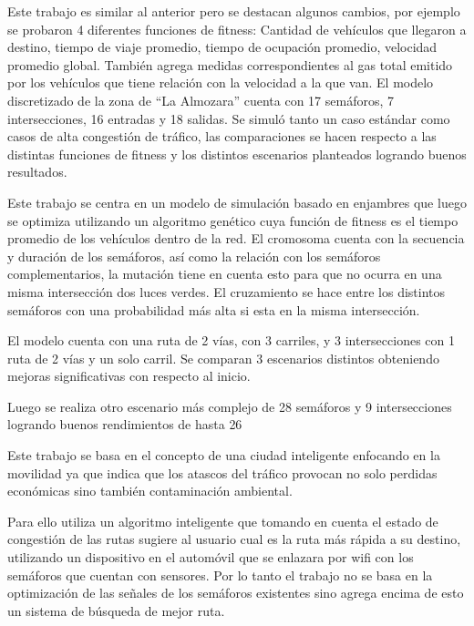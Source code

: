 \begin{itemize}
	\begin{item}
Este trabajo es similar al anterior pero se destacan algunos cambios, por ejemplo se probaron 4 diferentes funciones de fitness: Cantidad de vehículos que llegaron a destino, tiempo de viaje promedio, tiempo de ocupación promedio, velocidad promedio global.
También agrega medidas correspondientes al gas total emitido por los vehículos que tiene relación con la velocidad a la que van.
El modelo discretizado de la zona de “La Almozara” cuenta con 17 semáforos, 7 intersecciones, 16 entradas y 18 salidas.
Se simuló tanto un caso estándar como casos de alta congestión de tráfico, las comparaciones se hacen respecto a las distintas funciones de fitness y los distintos escenarios planteados logrando buenos resultados.
	
	\end{item}
	

	\begin{item}
		\bibentry{Penner2002}
Este trabajo se centra en un modelo de simulación basado en enjambres que luego se optimiza utilizando un algoritmo genético cuya función de fitness es el tiempo promedio de los vehículos dentro de la red. El cromosoma cuenta con la secuencia y duración de los semáforos, así como la relación con los semáforos complementarios, la mutación tiene en cuenta esto para que no ocurra en una misma intersección dos luces verdes. El cruzamiento se hace entre los distintos semáforos con una probabilidad más alta si esta en la misma intersección.

El modelo cuenta con una ruta de 2 vías, con 3 carriles, y 3 intersecciones con 1 ruta de 2 vías y un solo carril.
Se comparan 3 escenarios distintos obteniendo mejoras significativas con respecto al inicio.

Luego se realiza otro escenario más complejo de 28 semáforos  y 9 intersecciones logrando buenos rendimientos de hasta 26%
	\end{item}	
	
	
	\begin{item}
		\bibentry{Stolfi2012}
Este trabajo se basa en el concepto de una ciudad inteligente enfocando en la movilidad ya que indica que los atascos del tráfico provocan no solo perdidas económicas sino también contaminación ambiental.

Para ello utiliza un algoritmo inteligente que tomando en cuenta el estado de congestión de las rutas sugiere al usuario cual es la ruta más rápida a su destino, utilizando un dispositivo en el automóvil que se enlazara por wifi con los semáforos que cuentan con sensores. Por lo tanto el trabajo no se basa en la optimización de las señales de los semáforos existentes sino agrega encima de esto un sistema de búsqueda de mejor ruta.


\end{item}
\end{itemize}
